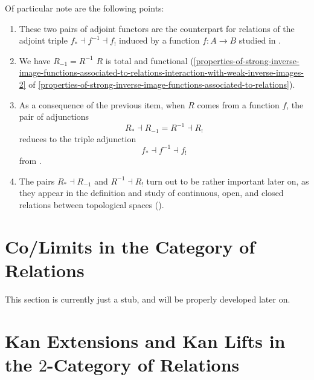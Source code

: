 \begin{enumerate}
        Of particular note are the following points:
        \begin{enumerate}
            \item\label{constructions-with-relations-introduction-item-3a}These two pairs of adjoint functors are the counterpart for relations of the adjoint triple $f_{*}\dashv f^{-1}\dashv f_{!}$ induced by a function $f\colon A\to B$ studied in .
            \item\label{constructions-with-relations-introduction-item-3b}We have $R_{-1}=R^{-1}$ \textiff $R$ is total and functional (\cref{properties-of-strong-inverse-image-functions-associated-to-relations-interaction-with-weak-inverse-images-2} of \cref{properties-of-strong-inverse-image-functions-associated-to-relations}).
            \item\label{constructions-with-relations-introduction-item-3c}As a consequence of the previous item, when $R$ comes from a function $f$, the pair of adjunctions
                \[
                    R_{*}\dashv R_{-1}=R^{-1}\dashv R_{!}%
                \]%
                reduces to the triple adjunction
                \[
                    f_{*}\dashv f^{-1}\dashv f_{!}%
                \]%
                from .
            \item\label{constructions-with-relations-introduction-item-3d}The pairs $R_{*}\dashv R_{-1}$ and $R^{-1}\dashv R_{!}$ turn out to be rather important later on, as they appear in the definition and study of continuous, open, and closed relations between topological spaces ().
        \end{enumerate}
\end{enumerate}

\ChapterTableOfContents

\section{Co/Limits in the Category of Relations}\label{section-co-limits-in-the-category-of-relations}
This section is currently just a stub, and will be properly developed later on.
\section{Kan Extensions and Kan Lifts in the $2$-Category of Relations}\label{section-kan-extensions-and-kan-lifts-in-the-2-category-of-relations}
